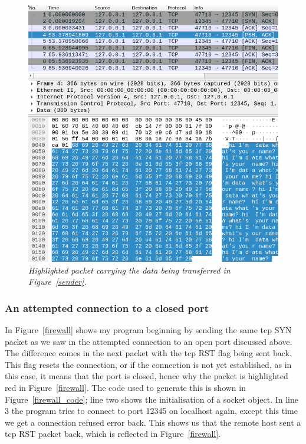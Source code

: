 \documentclass[titlepage]{article}
\let\Oldsubsubsection\subsubsection{}
\renewcommand{\subsubsection}{\FloatBarrier\Oldsubsubsection}
\begin{document}
\begin{figure}[H]
  \centering
  \includegraphics[width=\textwidth]{data.png}
  \caption{\textit{%
    Highlighted packet carrying the data being transferred in Figure~\ref{sender}.
}}\label{data}
\end{figure}

\subsubsection{An attempted connection to a closed port}
In Figure~\ref{firewall} shows my program beginning by sending the same \gls{tcp} SYN
packet as we saw in the attempted connection to an open port discussed above.
The difference comes in the next packet with the \gls{tcp} RST flag being sent
back. This flag resets the connection\cite{rfc:tcp}, or if the connection is not yet established,
as in this case, it means that the port is closed, hence why the packet is highlighted red
in Figure~\ref{firewall}. The code used to generate this is shown in Figure~\ref{firewall_code};
line two shows the initialisation of a socket object. In line 3 the program tries to connect
to port 12345 on localhost again, except this time we get a connection refused error back.
This shows us that the remote host sent a \gls{tcp} RST packet back, which is reflected in
Figure~\ref{firewall}.
\end{document}
